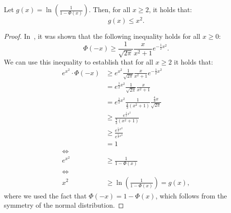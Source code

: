 \begin{lemma}
    \label{lemma:upper-bound}
    Let $g(x) = \ln \left(\frac{1}{1 - \Phi(x)}\right)$.
    Then, for all $x \geq 2$, it holds that:
    \begin{equation*}
        g(x) \leq x^2.
    \end{equation*}
\end{lemma}
\begin{proof}
    In~\cite{gaussian_bounds}, it was shown that the following inequality
    holds for all $x \geq 0$:
    \begin{equation*}
        \Phi(-x) \geq \frac{1}{\sqrt{2 \pi}} \frac{x}{x^2 + 1} e^{-\frac{1}{2} x^2}.
    \end{equation*}
    We can use this inequality to establish that for all
    $x \geq 2$ it holds that:
    \begin{align*}
        e^{x^2} \cdot \Phi(-x) & \geq e^{x^2} \frac{1}{\sqrt{2 \pi}} \frac{x}{x^2 + 1} e^{-\frac{1}{2} x^2}                           \\
                               & = e^{\frac{1}{2} x^2} \frac{1}{\sqrt{2 \pi}} \frac{x}{x^2 + 1}                                       \\
                               & = e^{\frac{1}{2} x^2} \frac{1}{\frac{4}{3}\left( x^2 + 1 \right)} \frac{\frac{4}{3} x}{\sqrt{2 \pi}} \\
                               & \geq \frac{e^{\frac{1}{2} x^2}}{\frac{4}{3}\left( x^2 + 1 \right)}                                   \\
                               & \geq \frac{e^{\frac{1}{2} x^2}}{e^{\frac{1}{2} x^2}}                                                 \\
                               & = 1                                                                                                  \\
        \iff                                                                                                                          \\
        e^{x^2}                & \geq \frac{1}{1 - \Phi(x)}                                                                           \\
        \iff                                                                                                                          \\
        x^2                    & \geq \ln \left(\frac{1}{1 - \Phi(x)}\right) = g(x),
    \end{align*}
    where we used the fact that $\Phi(-x) = 1 - \Phi(x)$, which follows
    from the symmetry of the normal distribution.
\end{proof}

